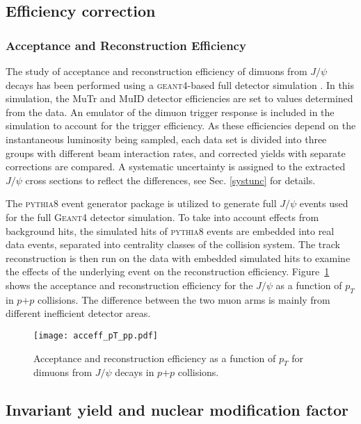 \documentclass[twocolumn,letterpaper,aps,prc,longbibliography,superscriptaddress,nofootinbib,floatfix]{revtex4-1}
\newcommand{\pt}{\mbox{$p_T$}\xspace}
\newcommand{\pp}{\mbox{$p$$+$$p$}\xspace}
\newcommand{\jpsi}{\mbox{$J/\psi$}\xspace}
\newcommand{\pythia}{\mbox{\textsc{pythia8}}\xspace}
\newcommand{\geant}{\mbox{\textsc{geant4}}\xspace}
\begin{document}
\subsection{Efficiency correction}

\subsubsection{Acceptance and Reconstruction Efficiency}
\label{sec:acc_eff}

The study of acceptance and reconstruction efficiency of dimuons from 
\jpsi decays has been performed using a \geant-based full detector 
simulation \cite{G4}. In this simulation, the MuTr and MuID detector 
efficiencies are set to values determined from the data.  An emulator of 
the dimuon trigger response is included in the simulation to account for 
the trigger efficiency.  As these efficiencies depend on the 
instantaneous luminosity being sampled, each data set is divided into 
three groups with different beam interaction rates, and corrected yields 
with separate corrections are compared.  A systematic uncertainty is 
assigned to the extracted \jpsi cross sections to reflect the 
differences, see Sec. \ref{systunc} for details.

The \pythia event generator package \cite{PYTHIA} is utilized to 
generate full \jpsi events used for the full \textsc{Geant4} detector 
simulation. To take into account effects from background hits, 
the simulated hits of \pythia events are embedded into real data events, 
separated into centrality classes of the collision system.  The track 
reconstruction is then run on the data with embedded simulated hits to 
examine the effects of the underlying event on the reconstruction 
efficiency. Figure~\ref{fig:acceff_pt} shows the acceptance and 
reconstruction efficiency for the \jpsi as a function of \pt in \pp 
collisions. The difference between the two muon arms is mainly from 
different inefficient detector areas.


\begin{figure}[htb]
\texttt{[image: acceff\_pT\_pp.pdf]}
\caption{\label{fig:acceff_pt}
Acceptance and reconstruction efficiency as a function of \pt for 
dimuons from \jpsi decays in \pp collisions.}
\end{figure}

\subsection{Invariant yield and nuclear modification factor}
\end{document}
